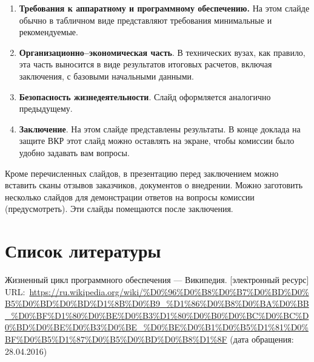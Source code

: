 \documentclass[a4paper,14pt,final]{extreport}
\begin{document}
\begin{enumerate}
\item \textbf{Требования к аппаратному и программному обеспечению.}  На этом слайде обычно в табличном виде представляют требования минимальные и рекомендуемые.
\item \textbf{Организационно--экономическая часть}.  В технических вузах, как правило, эта часть выносится в виде результатов итоговых расчетов, включая заключения, с базовыми начальными данными.
\item \textbf{Безопасность жизнедеятельности}.  Слайд оформляется аналогично предыдущему.
\item \textbf{Заключение}.  На этом слайде представлены результаты.  В конце доклада на защите ВКР этот слайд можно оставлять на экране, чтобы комиссии было удобно задавать вам вопросы.
\end{enumerate}

Кроме перечисленных слайдов, в презентацию перед заключением можно вставить сканы отзывов заказчиков, документов о внедрении.  Можно заготовить несколько слайдов для демонстрации ответов на вопросы комиссии (предусмотреть).  Эти слайды помещаются после заключения.

\section{Список литературы}
\label{sec:refs}

\begin{thebibliography}{99}
 Жизненный цикл программного обеспечения --- Википедия. [электронный ресурс] URL:~\url{https://ru.wikipedia.org/wiki/%D0%96%D0%B8%D0%B7%D0%BD%D0%B5%D0%BD%D0%BD%D1%8B%D0%B9_%D1%86%D0%B8%D0%BA%D0%BB_%D0%BF%D1%80%D0%BE%D0%B3%D1%80%D0%B0%D0%BC%D0%BC%D0%BD%D0%BE%D0%B3%D0%BE_%D0%BE%D0%B1%D0%B5%D1%81%D0%BF%D0%B5%D1%87%D0%B5%D0%BD%D0%B8%D1%8F} (дата обращения: 28.04.2016)
\end{thebibliography}
\end{document}
